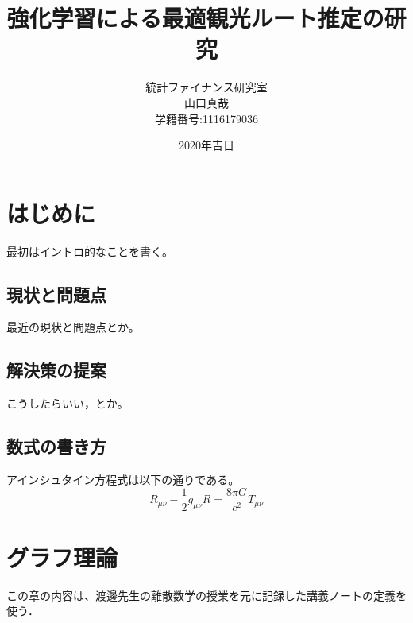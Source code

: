 \documentclass[a4paper,12pt]{jsreport}
\title{強化学習による最適観光ルート推定の研究}
\author{統計ファイナンス研究室\\
山口真哉\\
学籍番号:1116179036}
\date{2020年吉日}
\theoremstyle{definition}
\begin{document}
\maketitle
\tableofcontents

\chapter{はじめに}

最初はイントロ的なことを書く。
\section{現状と問題点}

最近の現状と問題点とか。

\section{解決策の提案}

こうしたらいい，とか。

\section{数式の書き方}

アインシュタイン方程式は以下の通りである。
\begin{equation}
    R_{\mu\nu} - \frac{1}{2} g_{\mu\nu} R = 
    \frac{8\pi G}{c^2} T_{\mu\nu}
\end{equation}

\chapter{グラフ理論}
この章の内容は、渡邊先生の離散数学の授業を元に記録した講義ノートの定義を使う．
\end{document}
